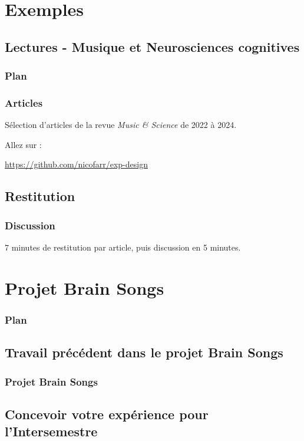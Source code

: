 \documentclass[xcolor=dvipsnames,english]{beamer}
\begin{document}
\section{Exemples}
\subsection{Lectures - Musique et Neurosciences cognitives}


\begin{frame}
  \frametitle{Plan}
  \tableofcontents[currentsection]
\end{frame}



\begin{frame}
  \frametitle{Articles}
  Sélection d'articles de la revue \textit{Music \& Science} de 2022 à 2024. 

  Allez sur : 

  \url{https://github.com/nicofarr/exp-design}

\end{frame}

\subsection{Restitution}

\begin{frame}
  \frametitle{Discussion}
  7 minutes de restitution par article, puis discussion en 5 minutes.
\end{frame}


\section{Projet Brain Songs}

\begin{frame}
  \frametitle{Plan}
  \tableofcontents[currentsection]
\end{frame}



\subsection{Travail précédent dans le projet Brain Songs}

\begin{frame}
  \frametitle{Projet Brain Songs}
\end{frame}

\subsection{Concevoir votre expérience pour l'Intersemestre}
\end{document}
